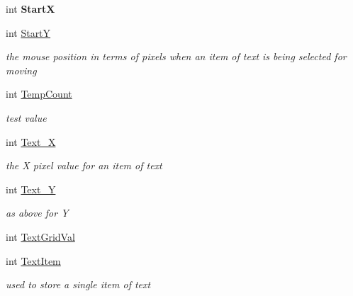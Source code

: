 \begin{DoxyCompactItemize}
\mbox{\label{class_t_interface_a3d33fe8a440f6ce7afec6a13e11d423b}} 
int {\bfseries StartX}
\item 
\mbox{\label{class_t_interface_ab0cdc0f538f6f6744776ef7198cadb43}} 
int \mbox{\hyperlink{class_t_interface_ab0cdc0f538f6f6744776ef7198cadb43}{StartY}}
\begin{DoxyCompactList}\small\item\em the mouse position in terms of pixels when an item of text is being selected for moving \end{DoxyCompactList}\item 
\mbox{\label{class_t_interface_aaea529fe22bcc881ee04cf9baae6ce2f}} 
int \mbox{\hyperlink{class_t_interface_aaea529fe22bcc881ee04cf9baae6ce2f}{Temp\+Count}}
\begin{DoxyCompactList}\small\item\em test value \end{DoxyCompactList}\item 
\mbox{\label{class_t_interface_a1a4cec30a0c45fb9dccf1477ed513ec1}} 
int \mbox{\hyperlink{class_t_interface_a1a4cec30a0c45fb9dccf1477ed513ec1}{Text\+\_\+X}}
\begin{DoxyCompactList}\small\item\em the \textquotesingle{}X\textquotesingle{} pixel value for an item of text \end{DoxyCompactList}\item 
\mbox{\label{class_t_interface_a490a8a7dbd3ff53297f30f43b02d5c7e}} 
int \mbox{\hyperlink{class_t_interface_a490a8a7dbd3ff53297f30f43b02d5c7e}{Text\+\_\+Y}}
\begin{DoxyCompactList}\small\item\em as above for \textquotesingle{}Y\textquotesingle{} \end{DoxyCompactList}\item 
int \mbox{\hyperlink{class_t_interface_a86dddbbcc24c740334718b1b80082c0d}{Text\+Grid\+Val}}
\item 
\mbox{\label{class_t_interface_a049c070bc8cf04330b359248b4d772d1}} 
int \mbox{\hyperlink{class_t_interface_a049c070bc8cf04330b359248b4d772d1}{Text\+Item}}
\begin{DoxyCompactList}\small\item\em used to store a single item of text \end{DoxyCompactList}\item 

\end{DoxyCompactItemize}
